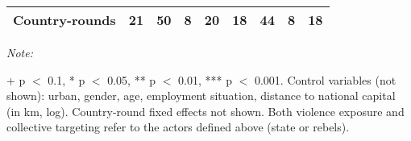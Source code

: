 \begin{table}[!h]
{\begin{threeparttable}
\begin{tabular}[t]{lcccccccc}
Country-rounds & 21 & 50 & 8 & 20 & 18 & 44 & 8 & 18\\
\bottomrule
\end{tabular}
\begin{tablenotes}[para]
\item \textit{Note: } 
\item + p $<$ 0.1, * p $<$ 0.05, ** p $<$ 0.01, *** p $<$ 0.001. Control variables (not shown): urban, gender, age, employment situation, distance to national capital (in km, log). Country-round fixed effects not shown. Both violence exposure and collective targeting refer to the actors defined above (state or rebels).
\end{tablenotes}
\end{threeparttable}}
\end{table}
